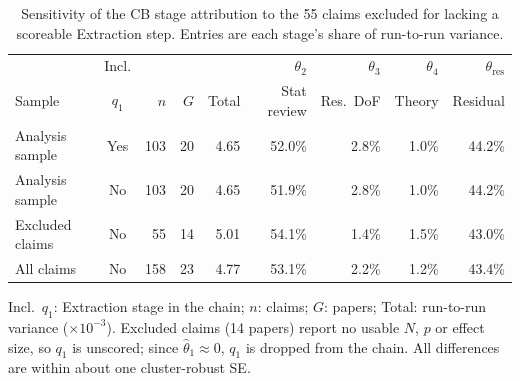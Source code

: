 \begin{table}[ht]
  \centering
  \small
  \setlength{\tabcolsep}{4pt}
  \caption{Sensitivity of the CB stage attribution to the 55 claims excluded for lacking a scoreable Extraction step.
    Entries are each stage's share of run-to-run variance.}
  \label{tab:cb-drop-sensitivity}
  \begin{tabular}{@{}lcrrrrrrr@{}}
    \toprule
    & Incl. & & & & $\theta_2$ & $\theta_3$ & $\theta_4$ & $\theta_{\mathrm{res}}$\\
    Sample & $q_1$ & $n$ & $G$ & Total & Stat review & Res.\ DoF & Theory & Residual\\
    \midrule
    Analysis sample  & Yes & 103 & 20 & 4.65 & 52.0\% & 2.8\% & 1.0\% & 44.2\%\\
    Analysis sample  & No  & 103 & 20 & 4.65 & 51.9\% & 2.8\% & 1.0\% & 44.2\%\\
    Excluded claims  & No  &  55 & 14 & 5.01 & 54.1\% & 1.4\% & 1.5\% & 43.0\%\\
    All claims       & No  & 158 & 23 & 4.77 & 53.1\% & 2.2\% & 1.2\% & 43.4\%\\
    \bottomrule
  \end{tabular}

  \smallskip
  \parbox{\linewidth}{\footnotesize
    Incl.\ $q_1$: Extraction stage in the chain; $n$: claims; $G$: papers; Total: run-to-run variance ($\times10^{-3}$).
    Excluded claims (14 papers) report no usable $N$, $p$ or effect size, so $q_1$ is unscored; since
    $\hat\theta_1\approx0$, $q_1$ is dropped from the chain. All differences are within about one cluster-robust SE.}
\end{table}
